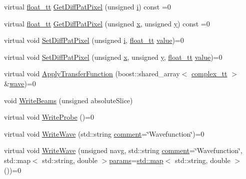 \begin{DoxyCompactItemize}
\item 
virtual \hyperlink{namespace_q_s_t_e_m_a915d7caa497280d9f927c4ce8d330e47}{float\-\_\-tt} \hyperlink{class_q_s_t_e_m_1_1_i_wave_a2abce10fbfb080bf6de44aa8179ae03a}{Get\-Diff\-Pat\-Pixel} (unsigned \hyperlink{_read_d_m3___matlab_8m_a6f6ccfcf58b31cb6412107d9d5281426}{i}) const =0
\item 
virtual \hyperlink{namespace_q_s_t_e_m_a915d7caa497280d9f927c4ce8d330e47}{float\-\_\-tt} \hyperlink{class_q_s_t_e_m_1_1_i_wave_a568bfb74aeff5fabfaff1b04a7441957}{Get\-Diff\-Pat\-Pixel} (unsigned \hyperlink{_read_d_m3___matlab_8m_a9336ebf25087d91c818ee6e9ec29f8c1}{x}, unsigned \hyperlink{qmb_8m_a2fb1c5cf58867b5bbc9a1b145a86f3a0}{y}) const =0
\item 
virtual void \hyperlink{class_q_s_t_e_m_1_1_i_wave_afaf2f2f4204b157dd15efa610e57d344}{Set\-Diff\-Pat\-Pixel} (unsigned \hyperlink{_read_d_m3___matlab_8m_a6f6ccfcf58b31cb6412107d9d5281426}{i}, \hyperlink{namespace_q_s_t_e_m_a915d7caa497280d9f927c4ce8d330e47}{float\-\_\-tt} \hyperlink{read_config_file_8m_afcc7a4b78ecd8fa7e713f8cfa0f51017}{value})=0
\item 
virtual void \hyperlink{class_q_s_t_e_m_1_1_i_wave_a4bfe783a9e4fa71a04f9c732ad7c2b7e}{Set\-Diff\-Pat\-Pixel} (unsigned \hyperlink{_read_d_m3___matlab_8m_a9336ebf25087d91c818ee6e9ec29f8c1}{x}, unsigned \hyperlink{qmb_8m_a2fb1c5cf58867b5bbc9a1b145a86f3a0}{y}, \hyperlink{namespace_q_s_t_e_m_a915d7caa497280d9f927c4ce8d330e47}{float\-\_\-tt} \hyperlink{read_config_file_8m_afcc7a4b78ecd8fa7e713f8cfa0f51017}{value})=0
\item 
virtual void \hyperlink{class_q_s_t_e_m_1_1_i_wave_a541f318b013822719efe81f3ff5998ae}{Apply\-Transfer\-Function} (boost\-::shared\-\_\-array$<$ \hyperlink{namespace_q_s_t_e_m_afa320ea3cd2f5ff080c422f81b803a32}{complex\-\_\-tt} $>$ \&\hyperlink{sim_image_from_wave_8m_acb3ac767ec1048cf315487da2b577ca4}{wave})=0
\item 
void \hyperlink{class_q_s_t_e_m_1_1_i_wave_a2ac78e28a5e324a9d6e4e30a2ffc8fec}{Write\-Beams} (unsigned absolute\-Slice)
\item 
virtual void \hyperlink{class_q_s_t_e_m_1_1_i_wave_a708c7290664300cf0673c5085acd7c4f}{Write\-Probe} ()=0
\item 
virtual void \hyperlink{class_q_s_t_e_m_1_1_i_wave_acb6c46ad9902da885e78fba93ab158d3}{Write\-Wave} (std\-::string \hyperlink{image_sim_8m_aea4cc4bd8e43a7f8ebf9b0ee3da8d681}{comment}=\char`\"{}Wavefunction\char`\"{})=0
\item 
virtual void \hyperlink{class_q_s_t_e_m_1_1_i_wave_a55ce202e1242b0f9d0ce3efc307fdb45}{Write\-Wave} (unsigned navg, std\-::string \hyperlink{image_sim_8m_aea4cc4bd8e43a7f8ebf9b0ee3da8d681}{comment}=\char`\"{}Wavefunction\char`\"{}, std\-::map$<$ std\-::string, double $>$\hyperlink{image_sim_8m_ad57b218fb254a1624c09ad71cb6b6415}{params}=\hyperlink{_displacement_params_8m_af619c74fd72bdb64d115463dff2720cd}{std\-::map}$<$ std\-::string, double $>$())=0

\end{DoxyCompactItemize}
